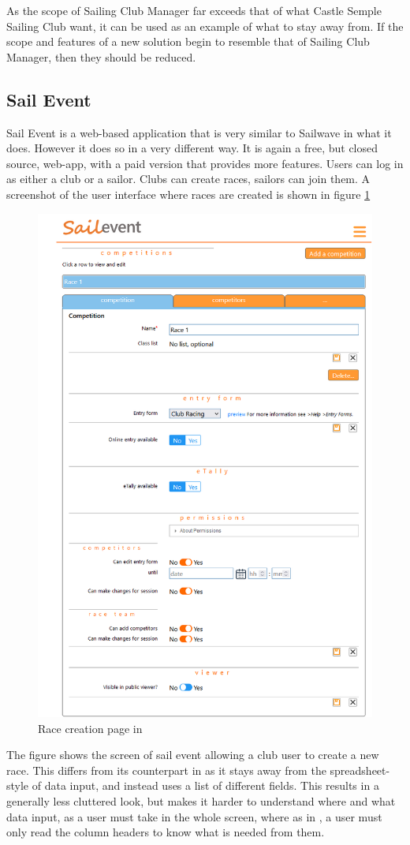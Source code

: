 \documentclass{l4proj}
\begin{document}
As the scope of Sailing Club Manager far exceeds that of what Castle Semple Sailing Club want, it can be used as an example of what to stay away from. If the scope and features of a new solution begin to resemble that of Sailing Club Manager, then they should be reduced.


\subsection{Sail Event}

Sail Event \citet{SailEvent} is a web-based application that is very similar to Sailwave in what it does. However it does so in a very different way. It is again a free, but closed source, web-app, with a paid version that provides more features. Users can log in as either a club or a sailor. Clubs can create races, sailors can join them. A screenshot of the user interface where races are created is shown in figure \ref{fig:sailEvent}

\begin{figure}[h!]
    \centering
    \includegraphics[width=0.6\linewidth]{images/Sailevent.png} 

    \caption{Race creation page in \citet{SailEvent}
    }

    \label{fig:sailEvent}
\end{figure}


The figure shows the screen of sail event allowing a club user to create a new race. This differs from its counterpart in \citet{sailwave} as it stays away from the spreadsheet-style of data input, and instead uses a list of different fields. This results in a generally less cluttered look, but makes it harder to understand where and what data input, as a user must take in the whole screen, where as in \citet{sailwave}, a user must only read the column headers to know what is needed from them.
\end{document}
